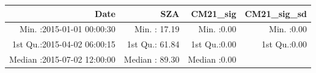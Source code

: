 \documentclass[
  10pt,
  a4paper,oneside]{article}
\begin{document}
\begin{longtable}[]{@{}rrrr@{}}
\toprule
\begin{minipage}[b]{0.34\columnwidth}\raggedleft
Date\strut
\end{minipage} & \begin{minipage}[b]{0.20\columnwidth}\raggedleft
SZA\strut
\end{minipage} & \begin{minipage}[b]{0.17\columnwidth}\raggedleft
CM21\_sig\strut
\end{minipage} & \begin{minipage}[b]{0.17\columnwidth}\raggedleft
CM21\_sig\_sd\strut
\end{minipage}\tabularnewline
\midrule
\endhead
\begin{minipage}[t]{0.34\columnwidth}\raggedleft
Min. :2015-01-01 00:00:30\strut
\end{minipage} & \begin{minipage}[t]{0.20\columnwidth}\raggedleft
Min. : 17.19\strut
\end{minipage} & \begin{minipage}[t]{0.17\columnwidth}\raggedleft
Min. :0.00\strut
\end{minipage} & \begin{minipage}[t]{0.17\columnwidth}\raggedleft
Min. :0.00\strut
\end{minipage}\tabularnewline
\begin{minipage}[t]{0.34\columnwidth}\raggedleft
1st Qu.:2015-04-02 06:00:15\strut
\end{minipage} & \begin{minipage}[t]{0.20\columnwidth}\raggedleft
1st Qu.: 61.84\strut
\end{minipage} & \begin{minipage}[t]{0.17\columnwidth}\raggedleft
1st Qu.:0.00\strut
\end{minipage} & \begin{minipage}[t]{0.17\columnwidth}\raggedleft
1st Qu.:0.00\strut
\end{minipage}\tabularnewline
\begin{minipage}[t]{0.34\columnwidth}\raggedleft
Median :2015-07-02 12:00:00\strut
\end{minipage} & \begin{minipage}[t]{0.20\columnwidth}\raggedleft
Median : 89.30\strut
\end{minipage} & \begin{minipage}[t]{0.17\columnwidth}\raggedleft
Median :0.00\strut
\end{minipage} & \begin{minipage}[t]{0.17\columnwidth}\raggedleft

\end{minipage}
\end{longtable}
\end{document}
